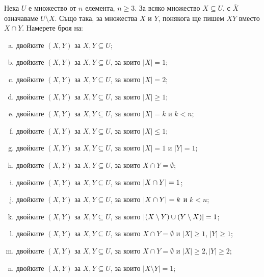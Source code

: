 \begin{problem} %
  Нека $U$ е множество от $n$ елемента, $n\geq 3$. За всяко множество $X\subseteq U$, с $\overline{X}$ означаваме $U\setminus X$.
  Също така, за множества $X$ и $Y$, понякога ще пишем $XY$ вместо $X \cap Y$.
  Намерете броя на:
  \begin{enumerate}[a)]
  \item
    двойките $(X,Y)$ за $X,Y\subseteq U$;
  \item
    двойките $(X,Y)$ за $X,Y\subseteq U$, за които $\vert{X}\vert = 1$;
  \item
    двойките $(X,Y)$ за $X,Y\subseteq U$, за които $\vert{X}\vert = 2$;
  \item
    двойките $(X,Y)$ за $X,Y\subseteq U$, за които $\vert{X}\vert \geq 1$;
  \item
    двойките $(X,Y)$ за $X,Y\subseteq U$, за които $\vert{X}\vert = k$ и $k < n$;
  \item
    двойките $(X,Y)$ за $X,Y\subseteq U$, за които $\vert{X}\vert \leq 1$;
  \item
    двойките $(X,Y)$ за $X,Y\subseteq U$, за които $\vert{X}\vert = 1$ и $\vert{Y}\vert = 1$;
  \item
    двойките $(X,Y)$ за $X,Y\subseteq U$, за които $X \cap Y = \emptyset$;
  \item
    двойките $(X,Y)$ за $X,Y\subseteq U$, за които $\lvert{X \cap Y}\rvert = 1$;
  \item
    двойките $(X,Y)$ за $X,Y\subseteq U$, за които $\lvert{X \cap Y}\rvert = k$ и $k < n$;
  \item
    двойките $(X,Y)$ за $X,Y\subseteq U$, за които $\lvert{(X\setminus Y) \cup (Y\setminus X)}\rvert = 1$;
  \item
    двойките $(X,Y)$ за $X,Y\subseteq U$, за които $X\cap Y = \emptyset$ и
    $|X|\geq 1$, $|Y|\geq 1$;
  \item
    двойките $(X,Y)$ за $X,Y\subseteq U$, за които $X\cap Y = \emptyset$ и 
    $|X|\geq 2, |Y|\geq 2$;
  \item
    двойките $(X,Y)$ за $X,Y\subseteq U$, за които $\vert{X\setminus Y}\vert = 1$;

\end{enumerate}
\end{problem}
